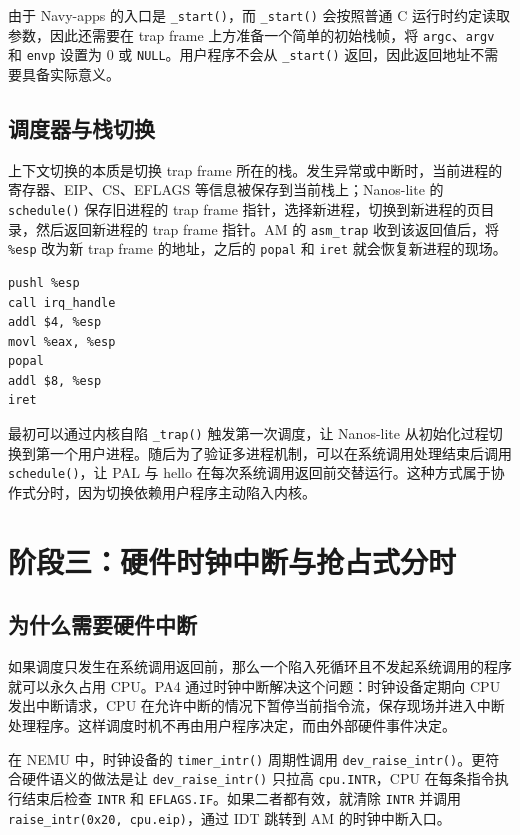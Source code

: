 由于 Navy-apps 的入口是 \texttt{\_start()}，而 \texttt{\_start()} 会按照普通 C 运行时约定读取参数，因此还需要在 trap frame 上方准备一个简单的初始栈帧，将 \texttt{argc}、\texttt{argv} 和 \texttt{envp} 设置为 0 或 \texttt{NULL}。用户程序不会从 \texttt{\_start()} 返回，因此返回地址不需要具备实际意义。

\subsection{调度器与栈切换}

上下文切换的本质是切换 trap frame 所在的栈。发生异常或中断时，当前进程的寄存器、EIP、CS、EFLAGS 等信息被保存到当前栈上；Nanos-lite 的 \texttt{schedule()} 保存旧进程的 trap frame 指针，选择新进程，切换到新进程的页目录，然后返回新进程的 trap frame 指针。AM 的 \texttt{asm\_trap} 收到该返回值后，将 \texttt{\%esp} 改为新 trap frame 的地址，之后的 \texttt{popal} 和 \texttt{iret} 就会恢复新进程的现场。

\begin{lstlisting}[language={[x86masm]Assembler},caption={asm\_trap 中完成上下文切换的关键动作},frame=single]
pushl %esp
call irq_handle
addl $4, %esp
movl %eax, %esp
popal
addl $8, %esp
iret
\end{lstlisting}

最初可以通过内核自陷 \texttt{\_trap()} 触发第一次调度，让 Nanos-lite 从初始化过程切换到第一个用户进程。随后为了验证多进程机制，可以在系统调用处理结束后调用 \texttt{schedule()}，让 PAL 与 hello 在每次系统调用返回前交替运行。这种方式属于协作式分时，因为切换依赖用户程序主动陷入内核。

\section{阶段三：硬件时钟中断与抢占式分时}

\subsection{为什么需要硬件中断}

如果调度只发生在系统调用返回前，那么一个陷入死循环且不发起系统调用的程序就可以永久占用 CPU。PA4 通过时钟中断解决这个问题：时钟设备定期向 CPU 发出中断请求，CPU 在允许中断的情况下暂停当前指令流，保存现场并进入中断处理程序。这样调度时机不再由用户程序决定，而由外部硬件事件决定。

在 NEMU 中，时钟设备的 \texttt{timer\_intr()} 周期性调用 \texttt{dev\_raise\_intr()}。更符合硬件语义的做法是让 \texttt{dev\_raise\_intr()} 只拉高 \texttt{cpu.INTR}，CPU 在每条指令执行结束后检查 \texttt{INTR} 和 \texttt{EFLAGS.IF}。如果二者都有效，就清除 \texttt{INTR} 并调用 \texttt{raise\_intr(0x20, cpu.eip)}，通过 IDT 跳转到 AM 的时钟中断入口。

